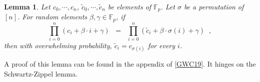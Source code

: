 \documentclass[11pt, lettersize, notitlepage, leqno, footskip=0.6cm]{article}
\newcommand{\bFp}{\mathbb{F}_p}
\newcommand{\wti}{\widetilde}
\newcommand{\mc}{\mathcal}
\newcommand{\be}{\beta}
\newcommand{\what}{\widehat}
\newcommand{\vs}{\vspace{-0.15cm}}
\newcommand{\noin}{\noindent}
\newcommand{\op}{overwhelming probability}
\newtheorem{Lem}[Thm]{Lemma}
\numberwithin{equation}{section}
\begin{document}
\begin{Lem} Let $c_0,\cdots,c_n$, $\wti{c}_0,\cdots,\wti{c}_n$ be elements of $\bFp$. Let $\sigma$ be a permutation of $[n]$. For random elements $\be,\gamma\in \bFp$, if \vs $$ \prod\limits_{i=0}^n (c_i+\be\cdot i + \gamma)\;\; =\;\; \prod\limits_{i=0}^n (\wti{c}_i+\be\cdot \sigma(i) + \gamma)\;\;, $$ then with \op, $\wti{c}_i = c_{\sigma(i)}$ for every $i$. \end{Lem}

\noin A proof of this lemma can be found in the appendix of \hyperlink{PLONK}{[GWC19]}. It hinges on the Schwartz-Zippel lemma.



\begin{comment}


\section{\fontsize{11}{11}\selectfont Sequential Hadamard products}

We discuss a protocol that allows a Prover to show that given two committed polynomials, the second is obtained from the first via a sequence of Hadamard product. More precisely, given commitments to polynomials $f(X)$, $h(X)$ and a commitment to an integer $n$, the Prover can prove succinctly (constant-sized) and in zero-knowledge that he knows elements $c_i\in \bFp$ and an integer $N$ such that: \vspace{2mm}

\noin 1. $f(X) = \sum\limits_{i=0}^{\deg(f)} c_iX^i$, $a = g_1^{f(s)}$ \vspace{1mm}

\noin 2. $ P =   g_1^N$. \vspace{1mm}

\noin 3. $h(X) = \sum\limits_{i=0}^{\deg(f)} c_iX^i$, $b = g_1^{h(s)}$. \vspace{2mm}

The Prover \textit{verifiably} sends a commitment to the polynomial $f(X^k)$. He then verifiably sends a commitment to the polynomial \vs $$ \wti{f}(X):=  f(X)\sum\limits_{i=0}^{\deg(f)} X^{k\cdot i} = f(X)\cdot \frac{X^{k\cdot(\deg(f)+1)}-1}{X^{k}-1}. \vs $$ In response to a randomly generated challenge $\gamma$, he sends a commitment to the polynomial \vs $$\wti{f}_{\gamma}(X):= \wti{f}(X) \odot \Big[\sum\limits_{i=0}^{\deg(f)}\sum\limits_{j=0}^{k} X^{k\cdot i+j} \gamma^i\Big] = \wti{f}(X) \odot \Big[\frac{(\gamma\cdot X^k)^{\deg(f)+1}-1}{\gamma\cdot X^k -1}\cdot \frac{X^k-1}{X-1}   \Big] \vs $$

Now, for a randomly generated challenge $\be$, the Prover sends a commitment to the polynomial \vs $$\what{f}(X):= \sum\limits_{i=0}^{\deg(f)} \frac{X^n - c_i^n }{X-c_i}\cdot \gamma^i \cdot  X^{k\cdot i}. \vs $$ He then shows that the product \vs $$f_{_{\prod}}(X):= \what{f}(X)\cdot f(X^k)  \vs $$ is such that the index set $\mc{I}_k$ given by the interval $[k\cdot \deg(f),\; k\cdot (\deg(f)+1)-1] $ satisfies \vs $$ f_{_{\prod}}(X)\odot \chi_{_{\mc{I}_k}} = X^{k\cdot \deg(f)} \cdot \wti{f}_{\gamma}(X)   \vs $$





\end{comment}
\end{document}
